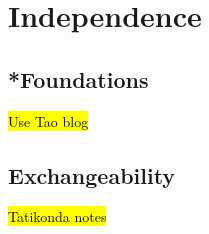 
\chapter{Independence}

\section{{*}Foundations}

\hl{Use Tao blog}

\section{Exchangeability}

\hl{Tatikonda notes}
